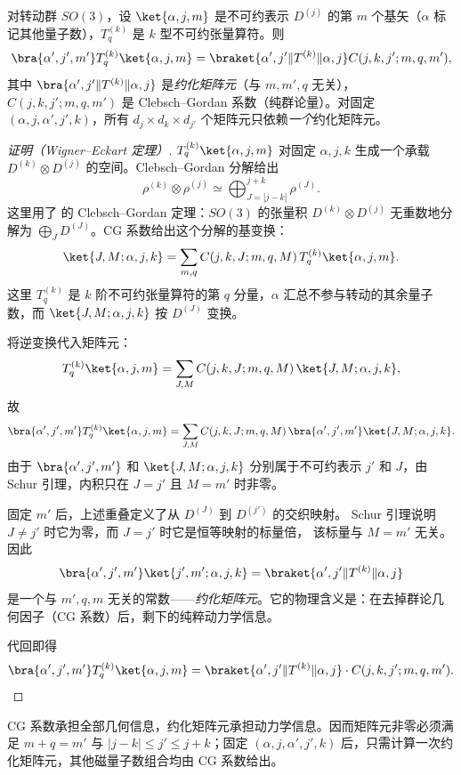 \begin{theorem}
对转动群 $SO(3)$，设 $\ket{\alpha,j,m}$ 是不可约表示 $D^{(j)}$ 的第 $m$ 个基矢（$\alpha$ 标记其他量子数），$T_q^{(k)}$ 是 $k$ 型不可约张量算符。则
\[
\bra{\alpha',j',m'}T_q^{(k)}\ket{\alpha,j,m}
=\braket{\alpha',j'\|T^{(k)}\|\alpha,j}
C(j,k,j';m,q,m'),
\]
其中 $\bra{\alpha',j'\|T^{(k)}\|\alpha,j}$ 是\emph{约化矩阵元}（与 $m,m',q$ 无关），$C(j,k,j';m,q,m')$ 是 Clebsch--Gordan 系数（纯群论量）。对固定 $(\alpha,j,\alpha',j',k)$，所有 $d_j\times d_k\times d_{j'}$ 个矩阵元只依赖\emph{一个}约化矩阵元。
\label{thm:wigner-eckart}
\end{theorem}

\par\medskip
\begin{proof}[证明（Wigner--Eckart 定理）]
$T_q^{(k)}\ket{\alpha,j,m}$ 对固定 $\alpha,j,k$ 生成一个承载
$D^{(k)}\otimes D^{(j)}$ 的空间。Clebsch--Gordan 分解给出
\[
\rho^{(k)}\otimes\rho^{(j)}\simeq\bigoplus_{J=|j-k|}^{j+k}\rho^{(J)}.
\]
这里用了  的 Clebsch--Gordan 定理：$SO(3)$ 的张量积 $D^{(k)}\otimes D^{(j)}$ 无重数地分解为 $\bigoplus_J D^{(J)}$。CG 系数给出这个分解的基变换：
\[
\ket{J,M;\alpha,j,k}
=\sum_{m,q}C(j,k,J;m,q,M)\,T_q^{(k)}\ket{\alpha,j,m}.
\]
这里 $T_q^{(k)}$ 是 $k$ 阶不可约张量算符的第 $q$ 分量，$\alpha$ 汇总不参与转动的其余量子数，而 $\ket{J,M;\alpha,j,k}$ 按 $D^{(J)}$ 变换。

将逆变换代入矩阵元：
\[
T_q^{(k)}\ket{\alpha,j,m}
=\sum_{J,M}C(j,k,J;m,q,M)\,\ket{J,M;\alpha,j,k},
\]
故
\[
\bra{\alpha',j',m'}T_q^{(k)}\ket{\alpha,j,m}
=\sum_{J,M}C(j,k,J;m,q,M)\,\bra{\alpha',j',m'}\ket{J,M;\alpha,j,k}.
\]
由于 $\bra{\alpha',j',m'}$ 和 $\ket{J,M;\alpha,j,k}$ 分别属于不可约表示 $j'$ 和 $J$，由 Schur 引理，内积只在 $J=j'$ 且 $M=m'$ 时非零。

固定 $m'$ 后，上述重叠定义了从 $D^{(J)}$ 到 $D^{(j')}$ 的交织映射。
Schur 引理说明 $J\neq j'$ 时它为零，而 $J=j'$ 时它是恒等映射的标量倍，
该标量与 $M=m'$ 无关。
因此
\[
\bra{\alpha',j',m'}\ket{j',m';\alpha,j,k}
=\braket{\alpha',j'\|T^{(k)}\|\alpha,j}
\]
是一个与 $m',q,m$ 无关的常数——\emph{约化矩阵元}。它的物理含义是：在去掉群论几何因子（CG 系数）后，剩下的纯粹动力学信息。

代回即得
\[
\bra{\alpha',j',m'}T_q^{(k)}\ket{\alpha,j,m}
=\braket{\alpha',j'\|T^{(k)}\|\alpha,j}\cdot C(j,k,j';m,q,m').
\]

\end{proof}\par\medskip

CG 系数承担全部几何信息，约化矩阵元承担动力学信息。因而矩阵元非零必须满足 $m+q=m'$ 与 $|j-k|\le j'\le j+k$；固定 $(\alpha,j,\alpha',j',k)$ 后，只需计算一次约化矩阵元，其他磁量子数组合均由 CG 系数给出。


